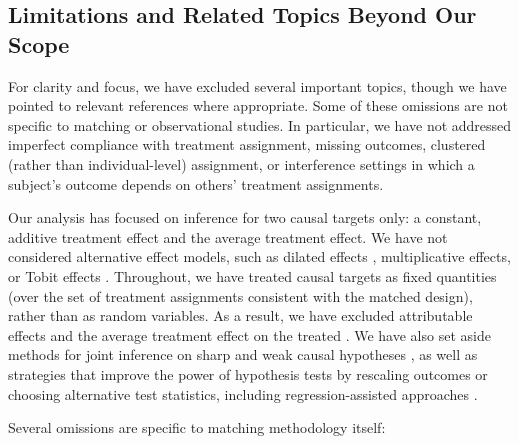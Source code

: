 \documentclass[
  12pt,
  leqno]{article}
\begin{document}
\subsection{Limitations and Related Topics Beyond Our
Scope}\label{limitations-and-related-topics-beyond-our-scope}

For clarity and focus, we have excluded several important topics, though
we have pointed to relevant references where appropriate. Some of these
omissions are not specific to matching or observational studies. In
particular, we have not addressed imperfect compliance with treatment
assignment, missing outcomes, clustered (rather than individual-level)
assignment, or interference settings in which a subject's outcome
depends on others' treatment assignments.

Our analysis has focused on inference for two causal targets only: a
constant, additive treatment effect and the average treatment effect. We
have not considered alternative effect models, such as dilated effects
\citep{rosenbaum1999}, multiplicative effects, or Tobit effects
\citep[pp.~46--49]{rosenbaum2010}. Throughout, we have treated causal
targets as fixed quantities (over the set of treatment assignments
consistent with the matched design), rather than as random variables. As
a result, we have excluded attributable effects
\citep{rosenbaum2001, rosenbaum2003, hansenbowers2009} and the average
treatment effect on the treated \citep{sekhonshem-tov2021}. We have also
set aside methods for joint inference on sharp and weak causal
hypotheses \citep{ding2017, wuding2021, cohenfogarty2022}, as well as
strategies that improve the power of hypothesis tests by rescaling
outcomes or choosing alternative test statistics, including
regression-assisted approaches
\citep{lin2013, cohenfogarty2023, guobasse2023}.

Several omissions are specific to matching methodology itself:
\end{document}
